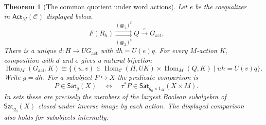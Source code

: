 \documentclass[11pt,a4paper]{article}
\newtheorem{theorem}{Theorem}[section]
\theoremstyle{definition}
\theoremstyle{remark}\newaliascnt{remark}{theorem}
\numberwithin{equation}{section}
\begin{document}
\begin{theorem}[The common quotient under word actions]\label{thm:ground-stable}
Let $e$ be the coequalizer in $\mathsf{Act}_M(\mathcal C)$ displayed below.
\[
 F(R_h)\underset{(qp_2)^\sharp}{\overset{(qp_1)^\sharp}{\rightrightarrows}}
 Q\xrightarrow{\ e\ }G_{\mathrm{act}}.
\]
There is a unique $d:H\to UG_{\mathrm{act}}$ with $dh=U(e)q$. For every $M$-action $K$, composition with $d$ and $e$ gives a natural bijection
\[
 \operatorname{Hom}_{M}(G_{\mathrm{act}},K)
 \cong
 \{(u,v)\in\operatorname{Hom}_{\mathcal C}(H,UK)\times
              \operatorname{Hom}_{M}(Q,K)\mid uh=U(v)q\}.
\]
Write $g=dh$. For a subobject $P\hookrightarrow X$ the predicate comparison is
\begin{equation}\label{eq:ground-action-predicates}
 P\in\mathsf{Sat}_g(X)
 \quad\Longleftrightarrow\quad
 \tau^*P\in\mathsf{Sat}_{g_0\times 1_M}(X\times M).
\end{equation}
In sets these are precisely the members of the largest Boolean subalgebra of $\mathsf{Sat}_{g_0}(X)$ closed under inverse image by each action. The displayed comparison also holds for subobjects internally.
\end{theorem}
\end{document}
